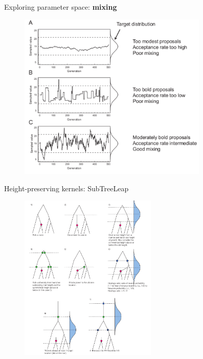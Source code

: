 \documentclass[newPxFont,numfooter,sectionpages]{beamer}
\begin{document}
\begin{frame}{Exploring parameter space: \textbf{mixing}}
\begin{figure}
	\includegraphics[width=\textwidth,height=8cm]{figures/mixing.pdf} 
\end{figure}
\end{frame}

\begin{frame}{Height-preserving kernels: SubTreeLeap}
\begin{figure}
	\includegraphics[width=\textwidth,height=8cm]{figures/STL_kernel.pdf} 
\end{figure}
\end{frame}
\end{document}
